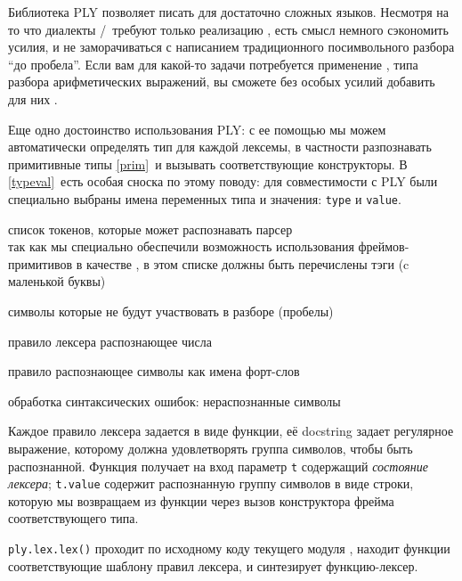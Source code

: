 \label{ply}

Библиотека PLY позволяет писать  для достаточно сложных языков.
Несмотря на то что диалекты \F/\pyf\ требуют только реализацию ,
есть смысл немного сэкономить усилия, и не заморачиваться с написанием
традиционного посимвольного разбора ``до пробела''. Если вам для какой-то задачи
потребуется применение , типа разбора арифметических
выражений, вы сможете без особых усилий добавить для них .

Еще одно достоинство использования PLY: с ее помощью мы можем автоматически
определять тип для каждой лексемы, в частности разпознавать примитивные типы
\ref{prim}\ и вызывать соответствующие конструкторы. В \ref{typeval}\ есть
особая сноска по этому поводу: для совместимости с PLY были специально выбраны
имена переменных типа и значения: \verb|type| и \verb|value|.

\clearpage
{}

\clearpage
\begin{description}[nosep]
\item[tokens] список токенов, которые может распознавать парсер\\
так как мы специально обеспечили возможность использования фрей\-мов-примитивов
в качестве , в этом списке должны быть перечислены тэги (c
маленькой буквы)
\item[t\_ignore] символы которые не будут участвовать в разборе (пробелы) 
\item[t\_number()] правило лексера распознающее числа
\item[t\_symbol()] правило распознающее символы как имена форт-слов
\item[t\_error()] обработка синтаксических ошибок: нераспознанные символы
\end{description}

\bigskip
\noindent
Каждое правило лексера задается в виде функции, её docstring задает регулярное
выражение, которому должна удовлетворять группа символов, чтобы быть
распознанной. Функция получает на вход параметр \verb|t| содержащий
\textit{состояние лексера}; \verb|t.value| содержит распознанную группу символов
в виде строки, которую мы возвращаем из функции через вызов конструктора фрейма
соответствующего типа.

\clearpage\noindent
\verb|ply.lex.lex()| проходит по исходному коду текущего модуля \py, находит
функции соответствующие шаблону правил лексера, и синтезирует функцию-лексер.

\medskip
{}
